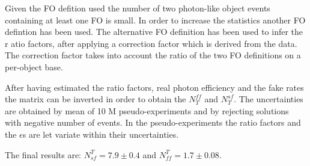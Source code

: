 Given the FO defition used the number of two photon-like object events containing at least one FO is small. In order to increase the statistics another FO defintion has been used. The alternative FO definition has been used to 
infer the r
atio factors, after applying a correction factor which is derived from the data. The correction factor takes into account the ratio of the two FO definitions on a per-object base.  


After having estimated the ratio factors, real photon efficiency and the fake rates the matrix can be inverted in order to obtain the $N^{ff}_{T}$ and $N^{sf}_{T}$. The uncertainties are obtained by mean of 10 M pseudo-experiments 
and by 
rejecting solutions with negative number of events. In the pseudo-experiments the ratio factors and the $\epsilon$s are let variate within their uncertainties.

The final results are: $N_{sf}^{T} =  7.9 \pm 0.4$ and $N_{ff}^{T} =  1.7  \pm 0.08$.











